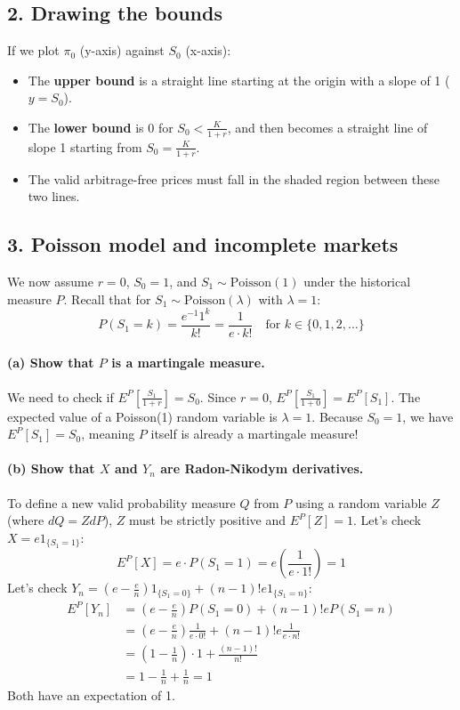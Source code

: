 \subsection*{2. Drawing the bounds}
If we plot $\pi_{0}$ (y-axis) against $S_{0}$ (x-axis):
\begin{itemize}
    \item The \textbf{upper bound} is a straight line starting at the origin with a slope of 1 ($y = S_{0}$).
    \item The \textbf{lower bound} is $0$ for $S_{0} < \frac{K}{1+r}$, and then becomes a straight line of slope 1 starting from $S_{0} = \frac{K}{1+r}$.
    \item The valid arbitrage-free prices must fall in the shaded region between these two lines.
\end{itemize}

\subsection*{3. Poisson model and incomplete markets}
We now assume $r=0$, $S_{0}=1$, and $S_{1} \sim \text{Poisson}(1)$ under the historical measure $P$.
Recall that for $S_{1} \sim \text{Poisson}(\lambda)$ with $\lambda=1$:
\begin{equation}
    P(S_{1} = k) = \frac{e^{-1} 1^{k}}{k!} = \frac{1}{e \cdot k!} \quad \text{for } k \in \{0, 1, 2, \dots\}
\end{equation}

\paragraph{(a) Show that $P$ is a martingale measure.}
We need to check if $E^{P}[\frac{S_{1}}{1+r}] = S_{0}$.
Since $r=0$, $E^{P}[\frac{S_{1}}{1+0}] = E^{P}[S_{1}]$.
The expected value of a Poisson(1) random variable is $\lambda = 1$.
Because $S_{0} = 1$, we have $E^{P}[S_{1}] = S_{0}$, meaning $P$ itself is already a martingale measure!

\paragraph{(b) Show that $X$ and $Y_{n}$ are Radon-Nikodym derivatives.}
To define a new valid probability measure $Q$ from $P$ using a random variable $Z$ (where $dQ = Z dP$), $Z$ must be strictly positive and $E^{P}[Z] = 1$.
Let's check $X = e 1_{\{S_{1}=1\}}$:
\begin{equation}
    E^{P}[X] = e \cdot P(S_{1}=1) = e \left( \frac{1}{e \cdot 1!} \right) = 1
\end{equation}
Let's check $Y_{n} = (e-\frac{e}{n})1_{\{S_{1}=0\}} + (n-1)!e 1_{\{S_{1}=n\}}$:
\begin{align}
    E^{P}[Y_{n}] &= \left(e - \frac{e}{n}\right) P(S_{1}=0) + (n-1)!e P(S_{1}=n) \\
    &= \left(e - \frac{e}{n}\right) \frac{1}{e \cdot 0!} + (n-1)!e \frac{1}{e \cdot n!} \\
    &= \left(1 - \frac{1}{n}\right) \cdot 1 + \frac{(n-1)!}{n!} \\
    &= 1 - \frac{1}{n} + \frac{1}{n} = 1
\end{align}
Both have an expectation of 1.

